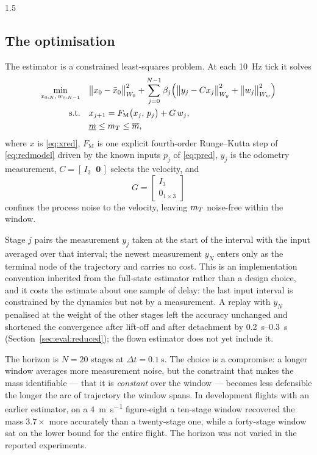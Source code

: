 \begin{spacing}{1.5}
\subsection{The optimisation}\label{sec:frame:mheocp}

The estimator is a constrained least-squares problem. At each \SI{10}{\hertz}
tick it solves
\begin{align}
\min_{x_{0:N},\, w_{0:N-1}} \quad
& \bigl\| x_0 - \bar{x}_0 \bigr\|^2_{W_0}
+ \sum_{j=0}^{N-1} \beta_j \Bigl( \bigl\| y_j - C x_j \bigr\|^2_{W_y}
+ \bigl\| w_j \bigr\|^2_{W_w} \Bigr) \nonumber \\
\mathrm{s.t.} \quad
& x_{j+1} = F_{\mathrm{M}}\bigl(x_j,\, p_j\bigr) + G\,w_j, \nonumber \\
& \underline{m} \le m_T \le \overline{m},
\label{eq:mhe}
\end{align}
where $x$ is \eqref{eq:xred}, $F_{\mathrm{M}}$ is one explicit fourth-order
Runge--Kutta step of \eqref{eq:redmodel} driven by the known inputs $p_j$ of
\eqref{eq:pred}, $y_j$ is the odometry measurement, $C=[\,I_3\;\;\bm 0\,]$
selects the velocity, and
\begin{equation}
G = \begin{bmatrix} I_{3} \\ 0_{1\times 3}\end{bmatrix}
\label{eq:Gmat}
\end{equation}
confines the process noise to the velocity, leaving $m_T$ noise-free within the
window.

Stage $j$ pairs the measurement $y_j$ taken at the start of the interval with the
input averaged over that interval; the newest measurement $y_N$ enters only as
the terminal node of the trajectory and carries no cost. This is an
implementation convention inherited from the full-state estimator rather than a
design choice, and it costs the estimate about one sample of delay: the last
input interval is constrained by the dynamics but not by a measurement. A replay
with $y_N$ penalised at the weight of the other stages left the accuracy
unchanged and shortened the convergence after lift-off and after detachment by
\SIrange{0.2}{0.3}{\second} (Section~\ref{sec:eval:reduced}); the flown
estimator does not yet include it.

The horizon is $N=20$ stages at $\Delta t=\SI{0.1}{\second}$. The choice is a
compromise: a longer window averages more measurement noise, but the constraint
that makes the mass identifiable --- that it is \emph{constant} over the window
--- becomes less defensible the longer the arc of trajectory the window spans. In
development flights with an earlier estimator, on a \SI{4}{\meter\per\second}
figure-eight a ten-stage window recovered the mass $3.7\times$ more accurately
than a twenty-stage one, while a forty-stage window sat on the lower bound for
the entire flight. The horizon was not varied in the reported experiments.


\end{spacing}
